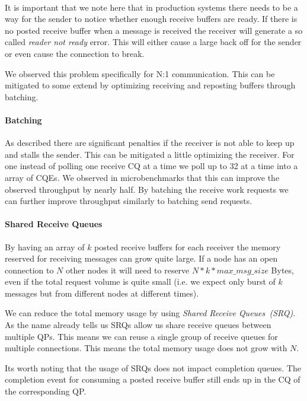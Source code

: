 \paragraph{} It is important that we note here that in production systems there needs to be a way for the sender to notice whether 
enough receive buffers are ready. If there is no posted receive buffer when a message is received the receiver will generate
a so called \emph{reader not ready} error. This will either cause a large back off for the sender or even cause the connection
to break.

We observed this problem specifically for N:1 communication. This can be mitigated to some extend by optimizing receiving and
reposting buffers through batching.

\paragraph{Batching} As described there are significant penalties if the receiver is not able to keep up and stalls the sender.
This can be mitigated a little optimizing the receiver. For one instead of polling one receive CQ at a time we poll up to 32
at a time into a array of CQEs. We observed in microbenchmarks that this can improve the observed throughput by nearly half. By
batching the receive work requests we can further improve throughput similarly to batching send requests.

\paragraph{Shared Receive Queues} By having an array of $k$ posted receive buffers for each receiver the memory reserved for 
receiving messages can grow quite large. If a node has an open connection to $N$ other nodes it will need to reserve 
$N*k*max\_msg\_size$ Bytes, even if the total request volume is quite small (i.e. we expect only burst of $k$ messages but 
from different nodes at different times).

We can reduce the total memory usage by using \emph{Shared Receive Queues~(SRQ)}. As the name already tells us SRQs allow us
share receive queues between multiple QPs. This means we can reuse a single group of receive queues for multiple connections.
This means the total memory usage does not grow with $N$.

Its worth noting that the usage of SRQs does not impact completion queues. The completion event for consuming a posted receive
buffer still ends up in the CQ of the corresponding QP.


